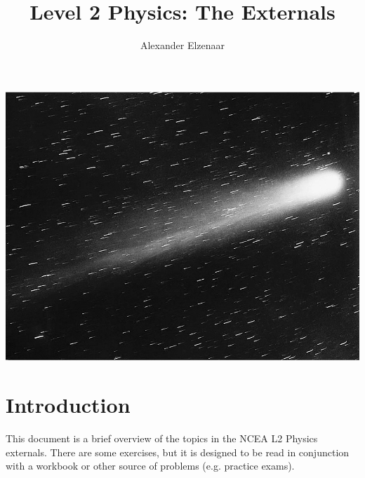 \documentclass[a4paper]{amsbook}
\title{Level 2 Physics: The Externals}
\author{Alexander Elzenaar}
\begin{document}
\begin{titlepage}
  \centering

  \makeatletter
  \vspace*{2cm}

  \includegraphics[width=\textwidth]{halley}

  \vspace*{\fill}

  \Huge{\textbf{\@title}}

  \vspace*{1cm}

  \Large\textit{\authors}

  \vspace*{\fill}

  \makeatother
\end{titlepage}

\tableofcontents

\chapter*{Introduction}
This document is a brief overview of the topics in the NCEA L2 Physics
externals. There are some exercises, but it is designed to be read in
conjunction with a workbook or other source of problems (e.g. practice
exams).
\end{document}
